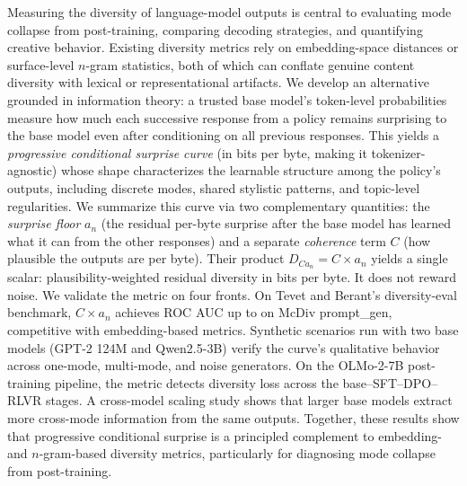 Measuring the diversity of language-model outputs is central to evaluating mode collapse from post-training, comparing decoding strategies, and quantifying creative behavior.
Existing diversity metrics rely on embedding-space distances or surface-level $n$-gram statistics, both of which can conflate genuine content diversity with lexical or representational artifacts.
We develop an alternative grounded in information theory: a trusted base model's token-level probabilities measure how much each successive response from a policy remains surprising to the base model even after conditioning on all previous responses.
This yields a \emph{progressive conditional surprise curve} (in bits per byte, making it tokenizer-agnostic) whose shape characterizes the learnable structure among the policy's outputs, including discrete modes, shared stylistic patterns, and topic-level regularities.
We summarize this curve via two complementary quantities: the \emph{surprise floor} $a_n$ (the residual per-byte surprise after the base model has learned what it can from the other responses) and a separate \emph{coherence} term $C$ (how plausible the outputs are per byte).
Their product $D_{Ca_n} = C \times a_n$ yields a single scalar: plausibility-weighted residual diversity in bits per byte.
It does not reward noise.
We validate the metric on four fronts.
On Tevet and Berant's diversity-eval benchmark, $C \times a_n$ achieves ROC AUC up to \tevetMcDivPromptGenAUC{} on McDiv prompt\_gen, competitive with embedding-based metrics.
Synthetic scenarios run with two base models (GPT-2 124M and Qwen2.5-3B) verify the curve's qualitative behavior across one-mode, multi-mode, and noise generators.
On the OLMo-2-7B post-training pipeline, the metric detects diversity loss across the base–SFT–DPO–RLVR stages.
A cross-model scaling study shows that larger base models extract more cross-mode information from the same outputs.
Together, these results show that progressive conditional surprise is a principled complement to embedding- and $n$-gram-based diversity metrics, particularly for diagnosing mode collapse from post-training.
